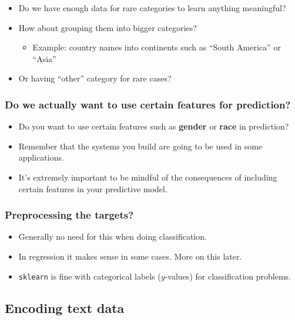 \documentclass[11pt]{article}
\providecommand{\tightlist}{%
      \setlength{\itemsep}{0pt}\setlength{\parskip}{0pt}}
\begin{document}
    \begin{itemize}
\tightlist
\item
  Do we have enough data for rare categories to learn anything
  meaningful?
\item
  How about grouping them into bigger categories?

  \begin{itemize}
  \tightlist
  \item
    Example: country names into continents such as ``South America'' or
    ``Asia''
  \end{itemize}
\item
  Or having ``other'' category for rare cases?
\end{itemize}

    \subsubsection{Do we actually want to use certain features for
prediction?}\label{do-we-actually-want-to-use-certain-features-for-prediction}

\begin{itemize}
\tightlist
\item
  Do you want to use certain features such as \textbf{gender} or
  \textbf{race} in prediction?
\item
  Remember that the systems you build are going to be used in some
  applications.
\item
  It's extremely important to be mindful of the consequences of
  including certain features in your predictive model.
\end{itemize}

    \subsubsection{Preprocessing the
targets?}\label{preprocessing-the-targets}

\begin{itemize}
\tightlist
\item
  Generally no need for this when doing classification.
\item
  In regression it makes sense in some cases. More on this later.
\item
  \texttt{sklearn} is fine with categorical labels (\(y\)-values) for
  classification problems.
\end{itemize}

    

    \subsection{Encoding text data}\label{encoding-text-data}
\end{document}
